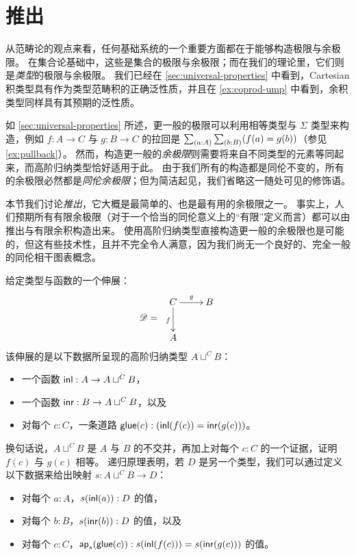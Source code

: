 %
%

%

\section{推出}
\label{sec:colimits}

%
%
%
%
从范畴论的观点来看，任何基础系统的一个重要方面都在于能够构造极限与余极限。
在集合论基础中，这些是集合的极限与余极限；而在我们的理论里，它们则是\emph{类型}的极限与余极限。
我们已经在 \cref{sec:universal-properties} 中看到，Cartesian 积类型具有作为类型范畴积的正确泛性质，并且在 \cref{ex:coprod-ump} 中看到，余积类型同样具有其预期的泛性质。

如 \cref{sec:universal-properties} 所述，更一般的极限可以利用相等类型与 $\Sigma$ 类型来构造，例如 $f:A\to C$ 与 $g:B\to C$ 的拉回是 $\sm{a:A}{b:B} (f(a)=g(b))$（参见 \cref{ex:pullback}）。
然而，构造更一般的\emph{余极限}则需要将来自不同类型的元素等同起来，而高阶归纳类型恰好适用于此。
由于我们所有的构造都是同伦不变的，所有的余极限必然都是\emph{同伦余极限}；但为简洁起见，我们省略这一随处可见的修饰语。

本节我们讨论\emph{推出}，它大概是最简单的、也是最有用的余极限之一。
事实上，人们预期所有有限余极限（对于一个恰当的同伦意义上的“有限”定义而言）都可以由推出与有限余积构造出来。
使用高阶归纳类型直接构造更一般的余极限也是可能的，但这有些技术性，且并不完全令人满意，因为我们尚无一个良好的、完全一般的同伦相干图表概念。

%
%
%
给定类型与函数的一个伸展：
\[\Ddiag=\;\vcenter{\xymatrix{C \ar^g[r] \ar_f[d] & B \\ A & }}\]
该伸展的是以下数据所呈现的高阶归纳类型 $A\sqcup^CB$：
\begin{itemize}
\item 一个函数 ${\mathsf{inl}}:A\to A\sqcup^CB$，
\item 一个函数 ${\mathsf{inr}}:B \to A\sqcup^CB$，以及
\item 对每个 $c:C$，一条道路 $\mathsf{glue}(c):({\mathsf{inl}}(f(c))={\mathsf{inr}}(g(c)))$。
\end{itemize}

换句话说，$A\sqcup^CB$ 是 $A$ 与 $B$ 的不交并，再加上对每个 $c:C$ 的一个证据，证明 $f(c)$ 与 $g(c)$ 相等。
递归原理表明，若 $D$ 是另一个类型，我们可以通过定义以下数据来给出映射 $s:A\sqcup^CB\to{}D$：
\begin{itemize}
\item 对每个 $a:A$，$s({\mathsf{inl}}(a)):D$ 的值，
\item 对每个 $b:B$，$s({\mathsf{inr}}(b)):D$ 的值，以及
\item 对每个 $c:C$，$\mathsf{ap}_{s}(\mathsf{glue}(c)):s({\mathsf{inl}}(f(c)))=s({\mathsf{inr}}(g(c)))$ 的值。
\end{itemize}

